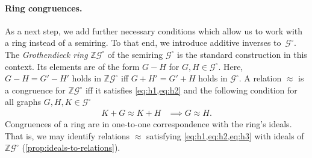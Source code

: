 \documentclass[11pt]{scrartcl}
\theoremstyle{definition}
\theoremstyle{plain}
\theoremstyle{remark}
\newcommand{\lG}{\mathcal{G}^\circ}
\begin{document}
	\paragraph{Ring congruences.}
	As a next step, we add further necessary conditions which allow us to work with a ring instead of a semiring.
	To that end, we introduce additive inverses to~$\lG$.
	The \emph{Grothendieck ring} $\mathbb{Z}\lG$ of the semiring $\lG$
	is the standard construction in this context.
	Its elements are of the form $G-H$ for $G, H \in \lG$.
	Here, $G - H = G' - H'$ holds in $\mathbb{Z}\lG$ iff $G + H' = G' + H$ holds in $\lG$.
	A relation $\approx$ is a congruence for $\mathbb{Z}\lG$ iff it satisfies \cref{eq:h1,eq:h2} 
	and the following condition for all graphs $G, H, K \in \lG$
	\begin{align}
		K + G \approx K + H &\implies G \approx H. \label{eq:h3}
	\end{align}
	Congruences of a ring are in one-to-one correspondence with the ring's ideals.
	That is, we may identify relations $\approx$ satisfying \cref{eq:h1,eq:h2,eq:h3} with ideals of $\mathbb{Z}\lG$ (\cref{prop:ideals-to-relations}).
	
\end{document}
